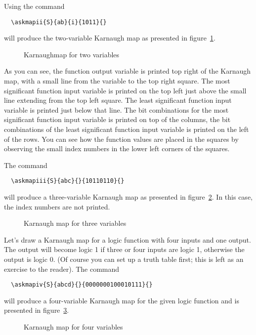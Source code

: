 \documentclass[a4paper,10pt]{ltxdoc}
\begin{document}
Using the command
\begin{verbatim}
  \askmapii{S}{ab}{i}{1011}{}
\end{verbatim}
will produce the two-variable Karnaugh map as presented in
figure~\ref{fig:askmapii}.
\begin{figure}[h]
\centering
\askmapunitlength=0.88cm
%
\caption{Karnaughmap for two variables}
\label{fig:askmapii}
\end{figure}

As you can see, the function output variable is printed top right of the
Karnaugh map, with a small line from the variable to the top right square.
The most significant function input variable is printed on the top left just
above the small line extending from the top left square. The least significant
function input variable is printed just below that line. The bit combinations
for the most significant function input variable is printed on top of the
columns, the bit combinations of the least significant function input variable
is printed on the left of the rows. You can see how the function values are
placed in the squares by observing the small index numbers in the lower left
corners of the squares.
\medskip

The command 
\begin{verbatim}
  \askmapiii{S}{abc}{}{10110110}{}
\end{verbatim}
will produce a three-variable Karnaugh map as presented in
figure~\ref{fig:askmapiii}. In this case, the index numbers are not printed.

\begin{figure}[H]
\centering
\askmapunitlength=0.88cm
%
\caption{Karnaugh map for three variables}
\label{fig:askmapiii}
\end{figure}

Let's draw a Karnaugh map for a logic function with four inputs and one output.
The output will become logic 1 if three or four inputs are logic 1, otherwise
the output is logic 0. (Of course you can set up a truth table first; this is
left as an exercise to the reader).
The command 
\begin{verbatim}
  \askmapiv{S}{abcd}{}{0000000100010111}{}
\end{verbatim}
will produce a four-variable Karnaugh map for the given logic function and is
presented in figure~\ref{fig:askmapiv}.

\begin{figure}[H]
\centering
\askmapunitlength=0.88cm
\caption{Karnaugh map for four variables}
\label{fig:askmapiv}
\end{figure}
\end{document}
